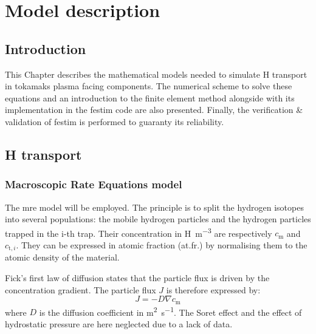 \setchapterpreamble[u]{\margintoc}
\chapter{Model description}
\label{Chapter2} %
\section{Introduction}
This Chapter describes the mathematical models needed to simulate H transport in tokamaks plasma facing components.
The numerical scheme to solve these equations and an introduction to the finite element method alongside with its implementation in the \gls{festim} code are also presented.
Finally, the verification \& validation of \gls{festim} is performed to guaranty its reliability.

\section{H transport} 


\subsection{Macroscopic Rate Equations model}

The \gls{mre} model will be employed.
The principle is to split the hydrogen isotopes into several populations: the mobile hydrogen particles and the hydrogen particles trapped in the i-th trap.
Their concentration in \si{H.m^{-3}} are respectively $c_\mathrm{m}$ and $c_{\mathrm{t},i}$.
They can be expressed in atomic fraction (at.fr.) by normalising them to the atomic density of the material.

Fick's first law of diffusion states that the particle flux is driven by the concentration gradient.
The particle flux $J$ is therefore expressed by:
\begin{equation}
    J = - D \nabla c_\mathrm{m}
\end{equation}
where $D$ is the diffusion coefficient in \si{m^2.s^{-1}}.
The Soret effect and the effect of hydrostatic pressure are here neglected due to a lack of data.


